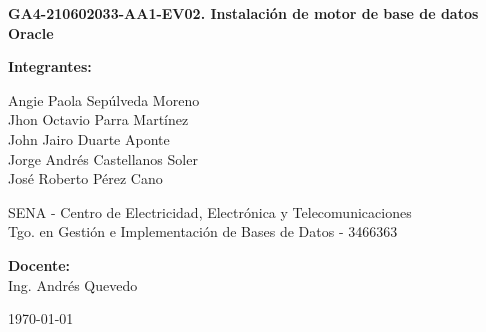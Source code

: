 	\begin{titlepage}
		\centering
		
		{\Large\bfseries GA4-210602033-AA1-EV02. Instalación de motor de base de datos Oracle \par}
		
		\vspace{5.5cm}
		
		{\large \textbf{Integrantes:} \par}
		\vspace{0.3cm}
		Angie Paola Sepúlveda Moreno \\
		Jhon Octavio Parra Martínez \\
		John Jairo Duarte Aponte \\
		Jorge Andrés Castellanos Soler \\
		José Roberto Pérez Cano \\
		
		\vfill
		
		SENA - Centro de Electricidad, Electrónica y Telecomunicaciones \\
		Tgo. en Gestión e Implementación de Bases de Datos - 3466363 \\
		
		\vspace{1cm}
		
		\textbf{Docente:} \\
		Ing. Andrés Quevedo \\
		
		\vspace{1.5cm}
		
		\today \par
		
	\end{titlepage}
